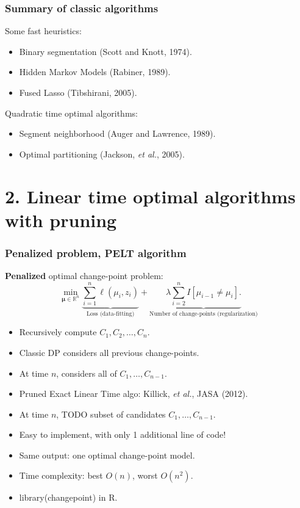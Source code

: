 \documentclass{beamer}
\newcommand{\RR}{\mathbb R}
\begin{document}
\begin{frame}
  \frametitle{Summary of classic algorithms}
  Some fast heuristics:
  \begin{itemize}
  \item Binary segmentation (Scott and Knott, 1974).
  \item Hidden Markov Models (Rabiner, 1989).
  \item Fused Lasso (Tibshirani, 2005).
  \end{itemize}
  Quadratic time optimal algorithms:
  \begin{itemize}
  \item Segment neighborhood (Auger and Lawrence, 1989).
  \item Optimal partitioning (Jackson, \emph{et al.}, 2005).
  \end{itemize}
\end{frame}

\section{2. Linear time optimal algorithms with pruning }

\begin{frame}
  \frametitle{Penalized problem, PELT algorithm}
  \textbf{Penalized} optimal change-point problem:
$$
\min_{
  \mathbf \mu\in\RR^{n}
}
\underbrace{\sum_{i=1}^{n} \ell( \mu_i,  z_i)}_{\text{Loss (data-fitting)}} + \underbrace{\lambda\sum_{i=2}^n I[\mu_{i-1}\neq \mu_i].}_{\text{Number of change-points (regularization)}}
$$
\begin{itemize}
\item Recursively compute $C_{1}, C_2,\dots, C_{n}$.
\item Classic DP considers all previous change-points.
\item At time $n$, considers all of $C_1,\dots,C_{n-1}$.
\item Pruned Exact Linear Time algo: Killick, \emph{et al.}, JASA (2012).
\item At time $n$, TODO subset of candidates $C_1,\dots,C_{n-1}$.
\item Easy to implement, with only 1 additional line of code!
\item Same output: one optimal change-point model.
\item Time complexity: best $O(n)$, worst $O(n^2)$.
\item library(changepoint) in R.
\end{itemize}
\end{frame}
\end{document}
